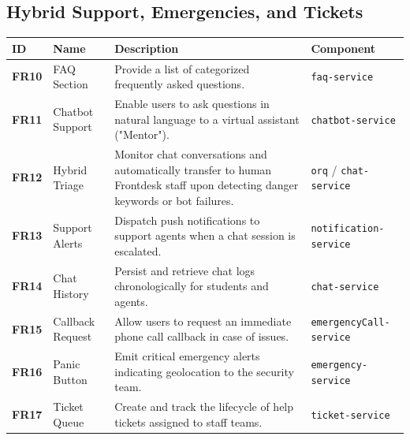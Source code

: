 \subsection{Hybrid Support, Emergencies, and Tickets}
\begin{tabular}{|l|l|p{7.5cm}|l|}
\hline
\textbf{ID} & \textbf{Name} & \textbf{Description} & \textbf{Component} \\ \hline
\textbf{FR10} & \ac{FAQ} Section & Provide a list of categorized frequently asked questions. & \texttt{faq-service} \\ \hline
\textbf{FR11} & Chatbot Support & Enable users to ask questions in natural language to a virtual assistant ("Mentor"). & \texttt{chatbot-service} \\ \hline
\textbf{FR12} & Hybrid Triage & Monitor chat conversations and automatically transfer to human Frontdesk staff upon detecting danger keywords or bot failures. & \texttt{orq} / \texttt{chat-service} \\ \hline
\textbf{FR13} & Support Alerts & Dispatch push notifications to support agents when a chat session is escalated. & \texttt{notification-service} \\ \hline
\textbf{FR14} & Chat History & Persist and retrieve chat logs chronologically for students and agents. & \texttt{chat-service} \\ \hline
\textbf{FR15} & Callback Request & Allow users to request an immediate phone call callback in case of issues. & \texttt{emergencyCall-service} \\ \hline
\textbf{FR16} & Panic Button & Emit critical emergency alerts indicating geolocation to the security team. & \texttt{emergency-service} \\ \hline
\textbf{FR17} & Ticket Queue & Create and track the lifecycle of help tickets assigned to staff teams. & \texttt{ticket-service} \\ \hline
\end{tabular}

